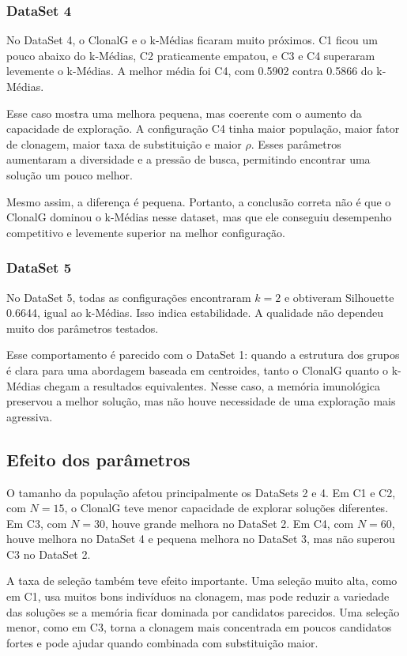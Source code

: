 \documentclass[12pt,a4paper]{article}
\begin{document}
\subsubsection*{DataSet 4}

No DataSet 4, o ClonalG e o k-Médias ficaram muito próximos. C1 ficou um pouco abaixo do k-Médias, C2 praticamente empatou, e C3 e C4 superaram levemente o k-Médias. A melhor média foi C4, com 0.5902 contra 0.5866 do k-Médias.

Esse caso mostra uma melhora pequena, mas coerente com o aumento da capacidade de exploração. A configuração C4 tinha maior população, maior fator de clonagem, maior taxa de substituição e maior \(\rho\). Esses parâmetros aumentaram a diversidade e a pressão de busca, permitindo encontrar uma solução um pouco melhor.

Mesmo assim, a diferença é pequena. Portanto, a conclusão correta não é que o ClonalG dominou o k-Médias nesse dataset, mas que ele conseguiu desempenho competitivo e levemente superior na melhor configuração.

\subsubsection*{DataSet 5}

No DataSet 5, todas as configurações encontraram \(k=2\) e obtiveram Silhouette 0.6644, igual ao k-Médias. Isso indica estabilidade. A qualidade não dependeu muito dos parâmetros testados.

Esse comportamento é parecido com o DataSet 1: quando a estrutura dos grupos é clara para uma abordagem baseada em centroides, tanto o ClonalG quanto o k-Médias chegam a resultados equivalentes. Nesse caso, a memória imunológica preservou a melhor solução, mas não houve necessidade de uma exploração mais agressiva.

\subsection{Efeito dos parâmetros}

O tamanho da população afetou principalmente os DataSets 2 e 4. Em C1 e C2, com \(N=15\), o ClonalG teve menor capacidade de explorar soluções diferentes. Em C3, com \(N=30\), houve grande melhora no DataSet 2. Em C4, com \(N=60\), houve melhora no DataSet 4 e pequena melhora no DataSet 3, mas não superou C3 no DataSet 2.

A taxa de seleção também teve efeito importante. Uma seleção muito alta, como em C1, usa muitos bons indivíduos na clonagem, mas pode reduzir a variedade das soluções se a memória ficar dominada por candidatos parecidos. Uma seleção menor, como em C3, torna a clonagem mais concentrada em poucos candidatos fortes e pode ajudar quando combinada com substituição maior.
\end{document}
